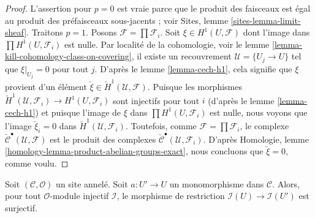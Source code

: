 \begin{proof}
L'assertion pour $p = 0$ est vraie parce que le produit des faisceaux est égal
au produit des préfaisceaux sous-jacents ; voir Sites,
lemme \ref{sites-lemma-limit-sheaf}.
Traitons $p = 1$. Posons $\mathcal{F} = \prod \mathcal{F}_i$.
Soit $\xi \in H^1(U, \mathcal{F})$ dont l'image dans
$\prod H^1(U, \mathcal{F}_i)$ est nulle. Par localité de la cohomologie, voir
le lemme \ref{lemma-kill-cohomology-class-on-covering}, il existe un
recouvrement $\mathcal{U} = \{U_j \to U\}$ tel que $\xi|_{U_j} = 0$ pour tout
$j$. D'après le lemme \ref{lemma-cech-h1}, cela signifie que $\xi$ provient
d'un élément
$\check \xi \in \check H^1(\mathcal{U}, \mathcal{F})$.
Puisque les morphismes
$\check H^1(\mathcal{U}, \mathcal{F}_i) \to H^1(U, \mathcal{F}_i)$
sont injectifs pour tout $i$ (d'après le lemme \ref{lemma-cech-h1}) et puisque
l'image de $\xi$ dans $\prod H^1(U, \mathcal{F}_i)$ est nulle, nous voyons
que l'image
$\check \xi_i = 0$ dans $\check H^1(\mathcal{U}, \mathcal{F}_i)$.
Toutefois, comme $\mathcal{F} = \prod \mathcal{F}_i$, le complexe
$\check{\mathcal{C}}^\bullet(\mathcal{U}, \mathcal{F})$ est le produit des
complexes $\check{\mathcal{C}}^\bullet(\mathcal{U}, \mathcal{F}_i)$.
D'après Homologie,
lemme \ref{homology-lemma-product-abelian-groups-exact}, nous concluons que
$\check \xi = 0$, comme voulu.
\end{proof}

\begin{lemma}
\label{lemma-restriction-along-monomorphism-surjective}
Soit $(\mathcal{C}, \mathcal{O})$ un site annelé. Soit $a : U' \to U$ un
monomorphisme dans $\mathcal{C}$. Alors, pour tout $\mathcal{O}$-module
injectif $\mathcal{I}$, le morphisme de restriction
$\mathcal{I}(U) \to \mathcal{I}(U')$ est surjectif.
\end{lemma}

